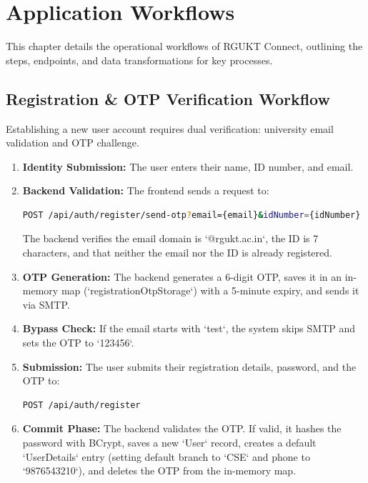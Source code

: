 \chapter{Application Workflows}
\label{ch:application_workflow}

This chapter details the operational workflows of RGUKT Connect, outlining the steps, endpoints, and data transformations for key processes.

\section{Registration \& OTP Verification Workflow}
Establishing a new user account requires dual verification: university email validation and OTP challenge.
\begin{enumerate}
    \item \textbf{Identity Submission:} The user enters their name, ID number, and email.
    \item \textbf{Backend Validation:} The frontend sends a request to:
    \begin{lstlisting}[language=bash]
    POST /api/auth/register/send-otp?email={email}&idNumber={idNumber}
    \end{lstlisting}
    The backend verifies the email domain is `@rgukt.ac.in`, the ID is 7 characters, and that neither the email nor the ID is already registered.
    \item \textbf{OTP Generation:} The backend generates a 6-digit OTP, saves it in an in-memory map (`registrationOtpStorage`) with a 5-minute expiry, and sends it via SMTP.
    \item \textbf{Bypass Check:} If the email starts with `test`, the system skips SMTP and sets the OTP to `123456`.
    \item \textbf{Submission:} The user submits their registration details, password, and the OTP to:
    \begin{lstlisting}[language=bash]
    POST /api/auth/register
    \end{lstlisting}
    \item \textbf{Commit Phase:} The backend validates the OTP. If valid, it hashes the password with BCrypt, saves a new `User` record, creates a default `UserDetails` entry (setting default branch to `CSE` and phone to `9876543210`), and deletes the OTP from the in-memory map.
\end{enumerate}

